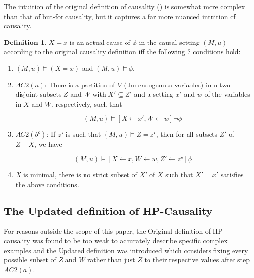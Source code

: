 \documentclass{article}
\theoremstyle{plain}
\theoremstyle{definition}
\newtheorem{defn}[thm]{Definition} %
\begin{document}
The intuition of the original definition of causality (\cite{halpern2005causes}) is somewhat more complex than that of but-for causality, but it captures a far more nuanced intuition of causality.

\begin{defn}$X=x$ is an actual cause of $\phi$ in the causal setting $(M,u)$ according to the original causality definition iff the following 3 conditions hold:
\begin{enumerate}
\item $(M,u) \models (X=x)$ and $(M,u) \models \phi$.
\item $AC2(a)$: There is a partition of $V$ (the endogenous variables) into two disjoint subsets $Z$ and $W$ with $X'\subseteq Z'$ and a setting $x'$ and $w$ of the variables in $X$ and $W$, respectively, such that

\[
(M,u) \models [X\leftarrow x', W\leftarrow w]\lnot \phi
\] 

\item $AC2(b^o)$: If $z^\star$ is such that $(M,u)\models Z = z^\star$, then for all subsets $Z'$ of $Z-X$, we have

\[
(M,u) \models [X\leftarrow x, W \leftarrow w, Z' \leftarrow z^\star]\phi
\] 

\item $X$ is minimal, there is no strict subset of $X'$ of $X$ such that $X' = x'$ satisfies the above conditions.
\end{enumerate}

\end{defn}

\subsection{The Updated definition of HP-Causality} \label{sec:updated}

For reasons outside the scope of this paper, the Original definition of HP-causality was found to be too weak to accurately describe specific complex examples and the Updated definition was introduced which considers fixing every possible subset of $Z$ and $W$ rather than just $Z$ to their respective values after step $AC2(a)$.
\end{document}
